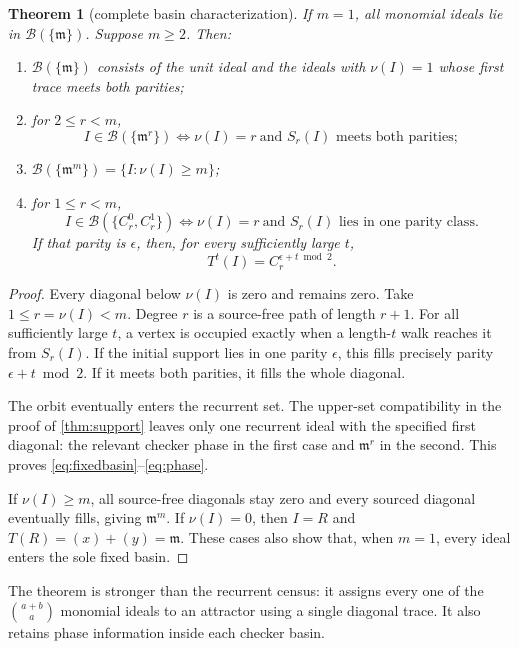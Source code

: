 \documentclass[10pt,a4paper]{amsart}
\newtheorem{theorem}{Theorem}[section]
\theoremstyle{definition}
\theoremstyle{remark}
\newcommand{\Basin}{\mathcal B}
\newcommand{\mm}{\mathfrak m}
\begin{document}
\begin{theorem}[complete basin characterization]\label{thm:basins}
If \(m=1\), all monomial ideals lie in \(\Basin(\{\mm\})\).
Suppose \(m\geq2\).  Then:
\begin{enumerate}[label=\textup{(\roman*)}]
\item \(\Basin(\{\mm\})\) consists of the unit ideal and the ideals with
      \(\nu(I)=1\) whose first trace meets both parities;
\item for \(2\leq r<m\),
\[
I\in\Basin(\{\mm^r\})
\Longleftrightarrow
\nu(I)=r\ \text{and }S_r(I)\text{ meets both parities};   \tag{4.3}\label{eq:fixedbasin}
\]
\item \(\Basin(\{\mm^m\})=\{I:\nu(I)\geq m\}\);
\item for \(1\leq r<m\),
\[
I\in\Basin(\{C_r^0,C_r^1\})
\Longleftrightarrow
\nu(I)=r\ \text{and }S_r(I)\text{ lies in one parity class}. \tag{4.4}\label{eq:checkerbasin}
\]
If that parity is \(\epsilon\), then, for every sufficiently large \(t\),
\[
                         T^t(I)=C_r^{\epsilon+t\bmod2}.    \tag{4.5}\label{eq:phase}
\]
\end{enumerate}
\end{theorem}

\begin{proof}
Every diagonal below \(\nu(I)\) is zero and remains zero.  Take
\(1\leq r=\nu(I)<m\).  Degree \(r\) is a source-free path of length \(r+1\).
For all sufficiently large \(t\), a vertex is occupied exactly when a
length-\(t\) walk reaches it from \(S_r(I)\).  If the initial support lies in
one parity \(\epsilon\), this fills precisely parity
\(\epsilon+t\bmod2\).  If it meets both parities, it fills the whole
diagonal.

The orbit eventually enters the recurrent set.  The upper-set compatibility
in the proof of \cref{thm:support} leaves only one recurrent ideal with the
specified first diagonal: the relevant checker phase in the first case and
\(\mm^r\) in the second.  This proves
\eqref{eq:fixedbasin}--\eqref{eq:phase}.

If \(\nu(I)\geq m\), all source-free diagonals stay zero and every sourced
diagonal eventually fills, giving \(\mm^m\).  If \(\nu(I)=0\), then \(I=R\)
and \(T(R)=(x)+(y)=\mm\).  These cases also show that, when \(m=1\), every
ideal enters the sole fixed basin.
\end{proof}

The theorem is stronger than the recurrent census: it assigns every one of
the \(\binom{a+b}{a}\) monomial ideals to an attractor using a single
diagonal trace.  It also retains phase information inside each checker
basin.
\end{document}

